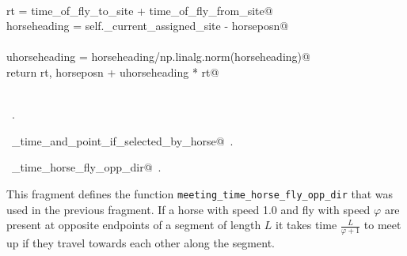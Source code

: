 \documentclass[11.5pt]{report}
\begin{document}
\begin{flushleft}
\begin{list}{}{}
\mbox{}\verb@@\\
\mbox{}\verb@      rt = time_of_fly_to_site + time_of_fly_from_site@\\
\mbox{}\verb@      horseheading = self._current_assigned_site - horseposn@\\
\mbox{}\verb@@\\
\mbox{}\verb@   uhorseheading = horseheading/np.linalg.norm(horseheading)@\\
\mbox{}\verb@   return rt, horseposn + uhorseheading * rt@\\
\mbox{}\verb@@\\
\mbox{}\verb@@{\NWsep}
\end{list}
\vspace{-1.5ex}
\footnotesize
\begin{list}{}{\setlength{\itemsep}{-\parsep}\setlength{\itemindent}{-\leftmargin}}
\item \NWtxtMacroRefIn\ .
\item \NWtxtIdentsDefed\nobreak\  \verb@rendezvous_time_and_point_if_selected_by_horse@\nobreak\ .\item \NWtxtIdentsUsed\nobreak\  \verb@meeting_time_horse_fly_opp_dir@\nobreak\ .
\item{}
\end{list}
\vspace{4ex}
\end{flushleft}


\vspace{-0.8cm} \newchunk This fragment defines the function \verb|meeting_time_horse_fly_opp_dir| that was
used in the previous fragment. If a horse with speed 1.0 and fly with speed $\varphi$ are present at opposite 
endpoints of a segment of length $L$ it takes time $\frac{L}{\varphi+1}$ to meet up if they travel towards 
each other along the segment.
 
\end{document}

